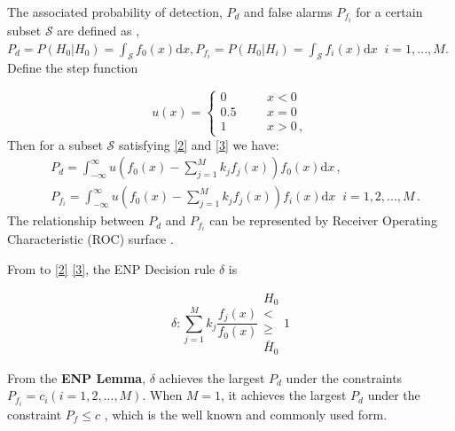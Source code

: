 \documentclass[12pt,journal,a4paper,twoside,onecolumn,draft]{IEEEtran}
\begin{document}
\begin{spacing}{2.5}
The associated probability of detection, $P_d$ and false alarms $P_{f_i}$ for a certain subset $\mathcal{S}$ are defined as \cite{neyman1933problem}, $P_d = P(H_0 | H_0) = \int_{\mathcal{S}}f_0(x)\mathrm{d}x, P_{f_i} = P(H_0 | H_i) = \int_{\mathcal{S}}f_i(x)\mathrm{d}x\;\; i = 1, ..., M $. Define the step function

\begin{equation}
   \label{equ: step function}
   u(x) = \begin{cases}
     0\;\;\;\;\;\;&x < 0\\
     0.5\;\;\;\;\;\;&x=0\\
     1\;\;\;\;\;\;&x>0\,,
   \end{cases}
\end{equation}
Then for a subset $\mathcal{S}$ satisfying \eqref{2} and \eqref{3} we have:
\begin{equation}
\label{equ: pf and pd}
\begin{split}
&P_d = \int_{-\infty}^{\infty} u(f_0(x) - \sum_{j=1}^{M}k_jf_j(x)) f_0(x)\mathrm{d}x	\,, \\
&P_{f_i} = \int_{-\infty}^{\infty} u(f_0(x) - \sum_{j=1}^{M}k_jf_j(x)) f_i(x) \mathrm{d}x\;\;	 i=1, 2, ..., M\,.
\end{split}
\end{equation}
The relationship between $P_d$ and $P_{f_i}$ can be represented by Receiver Operating Characteristic (ROC) surface \cite{LehmannTest}.

From to \eqref{2} \eqref{3}, the ENP Decision rule $\delta$ is

\begin{equation}
\label{equ: decision rule}
\delta: \sum_{j=1}^{M}k_j\frac{f_j(x)}{f_0(x)} \substack{H_0 \\ < \\ \geq \\ \bar{H}_0} 1
\end{equation}

From the  \textbf{ENP Lemma}, $\delta$  achieves the largest $P_d$ under the constraints $P_{f_i} = c_i (i = 1, 2, ..., M)$.
When $M=1$, it achieves the largest $P_d$ under the constraint $P_f \leq c$ \cite{LehmannTest}, which is the well known and commonly used form.


\end{spacing}
\end{document}
